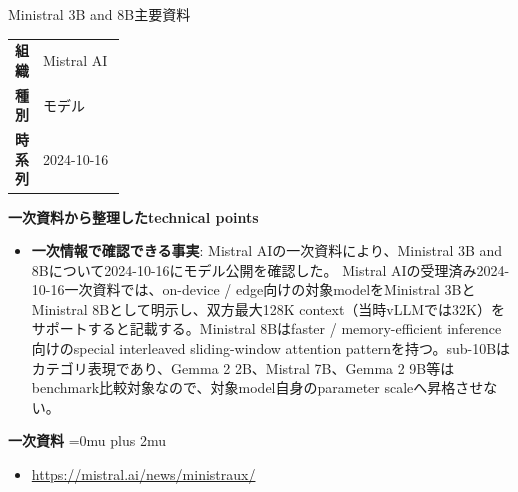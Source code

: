 \begin{technicalnote}{Ministral 3B and 8B}{主要資料}
\begingroup
\begin{tabularx}{\linewidth}{@{}>{\bfseries}p{0.22\linewidth}X@{}}
組織 & Mistral AI \\
種別 & モデル \\
時系列 & 2024-10-16 \\
\end{tabularx}
\smallskip
{\bfseries 一次資料から整理したtechnical points}
\begin{itemize}[leftmargin=1.5em,itemsep=0.35em]
\item \textbf{一次情報で確認できる事実}: Mistral AIの一次資料により、Ministral 3B and 8Bについて2024-10-16にモデル公開を確認した。 Mistral AIの受理済み2024-10-16一次資料では、on-device / edge向けの対象modelをMinistral 3BとMinistral 8Bとして明示し、双方最大128K context（当時vLLMでは32K）をサポートすると記載する。Ministral 8Bはfaster / memory-efficient inference向けのspecial interleaved sliding-window attention patternを持つ。sub-10Bはカテゴリ表現であり、Gemma 2 2B、Mistral 7B、Gemma 2 9B等はbenchmark比較対象なので、対象model自身のparameter scaleへ昇格させない。
\end{itemize}
\begin{minipage}{\linewidth}
\begin{samepage}
{\bfseries 一次資料}
\begingroup\sloppy
\Urlmuskip=0mu plus 2mu\relax
\begin{itemize}[leftmargin=1.5em,itemsep=0.25em]
\item {\scriptsize\url{https://mistral.ai/news/ministraux/}}
\end{itemize}
\endgroup
\end{samepage}
\end{minipage}
\endgroup
\end{technicalnote}
\medskip

